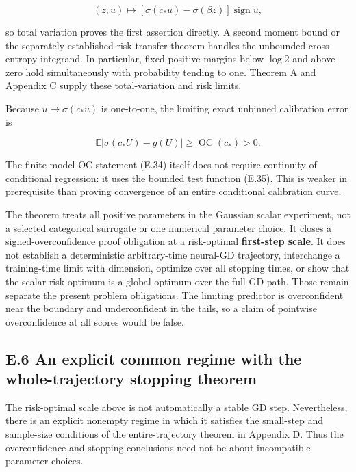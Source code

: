 \documentclass[
  11pt,
  a4paper,
]{article}
\begin{document}
\[
(z,u)\longmapsto
[\sigma(c_*u)-\sigma(\beta z)]\operatorname{sign}u,
\tag{E.35}
\]

so total variation proves the first assertion directly. A second moment
bound or the separately established risk-transfer theorem handles the
unbounded cross-entropy integrand. In particular, fixed positive margins
below \(\log2\) and above zero hold simultaneously with probability
tending to one. Theorem A and Appendix C supply these total-variation
and risk limits.

Because \(u\mapsto\sigma(c_*u)\) is one-to-one, the limiting exact
unbinned calibration error is

\[
\mathbb E|\sigma(c_*U)-g(U)|
\ge\operatorname{OC}(c_*)>0.
\tag{E.36}
\]

The finite-model OC statement (E.34) itself does not require continuity
of conditional regression: it uses the bounded test function (E.35).
This is weaker in prerequisite than proving convergence of an entire
conditional calibration curve.

The theorem treats all positive parameters in the Gaussian scalar
experiment, not a selected categorical surrogate or one numerical
parameter choice. It closes a signed-overconfidence proof obligation at
a risk-optimal \textbf{first-step scale}. It does not establish a
deterministic arbitrary-time neural-GD trajectory, interchange a
training-time limit with dimension, optimize over all stopping times, or
show that the scalar risk optimum is a global optimum over the full GD
path. Those remain separate the present problem obligations. The
limiting predictor is overconfident near the boundary and underconfident
in the tails, so a claim of pointwise overconfidence at all scores would
be false.

\hypertarget{e.6-an-explicit-common-regime-with-the-whole-trajectory-stopping-theorem}{%
\subsection{E.6 An explicit common regime with the whole-trajectory
stopping
theorem}\label{e.6-an-explicit-common-regime-with-the-whole-trajectory-stopping-theorem}}

The risk-optimal scale above is not automatically a stable GD step.
Nevertheless, there is an explicit nonempty regime in which it satisfies
the small-step and sample-size conditions of the entire-trajectory
theorem in Appendix D. Thus the overconfidence and stopping conclusions
need not be about incompatible parameter choices.
\end{document}
